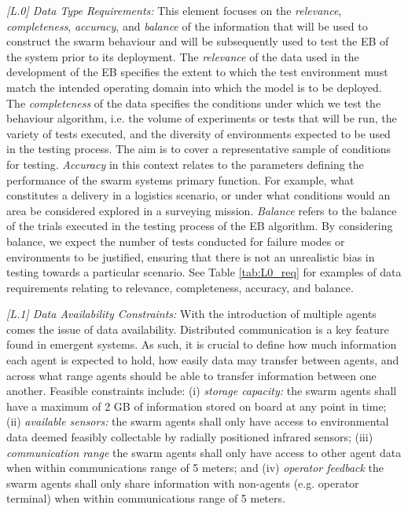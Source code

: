 \documentclass[runningheads]{llncs}
\begin{document}
\emph{[L.0] Data Type Requirements:}
This element focuses on the \emph{relevance}, \emph{completeness}, \emph{accuracy}, and \emph{balance} of the information that will be used to construct the swarm behaviour and will be subsequently used to test the EB of the system prior to its deployment. The \emph{relevance} of the data used in the development of the EB specifies the extent to which the test environment must match the intended operating domain into which the model is to be deployed. The \emph{completeness} of the data specifies the conditions under which we test the behaviour algorithm, i.e. the volume of experiments or tests that will be run, the variety of tests executed, and the diversity of environments expected to be used in the testing process. The aim is to cover a representative sample of conditions for testing. \emph{Accuracy} in this context relates to the parameters defining the performance of the swarm systems primary function. For example, what constitutes a delivery in a logistics scenario, or under what conditions would an area be considered explored in a surveying mission. \emph{Balance} refers to the balance of the trials executed in the testing process of the EB algorithm. By considering balance, we expect the number of tests conducted for failure modes or environments to be justified, ensuring that there is not an unrealistic bias in testing towards a particular scenario. See Table \ref{tab:L0_req} for examples of data requirements relating to relevance, completeness, accuracy, and balance.

\emph{[L.1] Data Availability Constraints:}
With the introduction of multiple agents comes the issue of data availability. Distributed communication is a key feature found in emergent systems. As such, it is crucial to define how much information each agent is expected to hold, how easily data may transfer between agents, and across what range agents should be able to transfer information between one another. Feasible constraints include: (i) \emph{storage capacity: }the swarm agents shall have a maximum of 2 GB of information stored on board at any point in time; (ii) \emph{available sensors:} the swarm agents shall only have access to environmental data deemed feasibly collectable by radially positioned infrared sensors; (iii) \emph{communication range} the swarm agents shall only have access to other agent data when within communications range of 5 meters; and (iv) \emph{operator feedback} the swarm agents shall only share information with non-agents (e.g. operator terminal) when within communications range of 5 meters.
\end{document}
